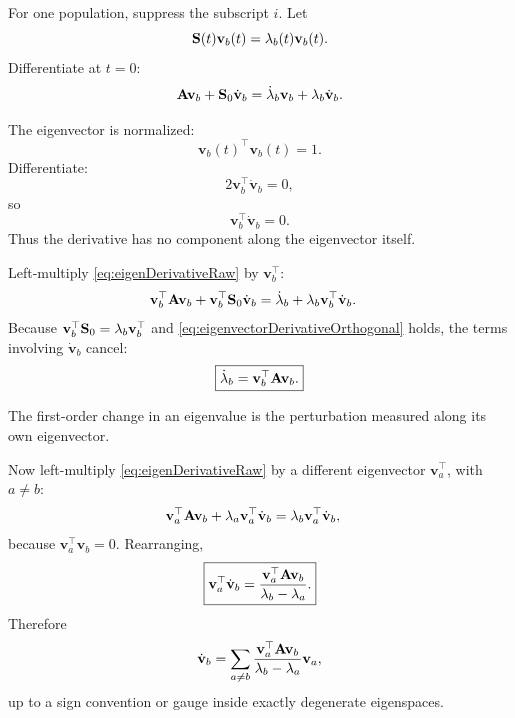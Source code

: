 For one population, suppress the subscript \(i\). Let
\begin{equation}
\mathbf{S}(t)\mathbf v_b(t)=\lambda_b(t)\mathbf v_b(t).
\label{eq:eigenEquationTime}
\end{equation}
Differentiate at \(t=0\):
\begin{equation}
\mathbf{A}\mathbf v_b+\mathbf{S}_0\dot{\mathbf v}_b
=\dot\lambda_b\mathbf v_b+\lambda_b\dot{\mathbf v}_b.
\label{eq:eigenDerivativeRaw}
\end{equation}

The eigenvector is normalized:
\begin{equation}
\mathbf v_b(t)^\top\mathbf v_b(t)=1.
\end{equation}
Differentiate:
\begin{equation}
2\mathbf v_b^\top\dot{\mathbf v}_b=0,
\end{equation}
so
\begin{equation}
\mathbf v_b^\top\dot{\mathbf v}_b=0.
\label{eq:eigenvectorDerivativeOrthogonal}
\end{equation}
Thus the derivative has no component along the eigenvector itself.

Left-multiply \cref{eq:eigenDerivativeRaw} by \(\mathbf v_b^\top\):
\begin{align}
\mathbf v_b^\top\mathbf{A}\mathbf v_b
+\mathbf v_b^\top\mathbf{S}_0\dot{\mathbf v}_b
&=\dot\lambda_b
+\lambda_b\mathbf v_b^\top\dot{\mathbf v}_b.
\end{align}
Because \(\mathbf v_b^\top\mathbf{S}_0=\lambda_b\mathbf v_b^\top\) and \cref{eq:eigenvectorDerivativeOrthogonal} holds, the terms involving \(\dot{\mathbf v}_b\) cancel:
\begin{equation}
\boxed{\dot\lambda_b=\mathbf v_b^\top\mathbf{A}\mathbf v_b.}
\label{eq:eigenvalueDerivative}
\end{equation}

\inwords The first-order change in an eigenvalue is the perturbation measured along its own eigenvector.

Now left-multiply \cref{eq:eigenDerivativeRaw} by a different eigenvector \(\mathbf v_a^\top\), with \(a\neq b\):
\begin{align}
\mathbf v_a^\top\mathbf{A}\mathbf v_b
+\lambda_a\mathbf v_a^\top\dot{\mathbf v}_b
&=\lambda_b\mathbf v_a^\top\dot{\mathbf v}_b,
\end{align}
because \(\mathbf v_a^\top\mathbf v_b=0\). Rearranging,
\begin{equation}
\boxed{
\mathbf v_a^\top\dot{\mathbf v}_b
=\frac{\mathbf v_a^\top\mathbf{A}\mathbf v_b}{\lambda_b-\lambda_a}.}
\label{eq:eigenvectorDerivativeCoefficient}
\end{equation}
Therefore
\begin{equation}
\dot{\mathbf v}_b
=\sum_{a\neq b}
\frac{\mathbf v_a^\top\mathbf{A}\mathbf v_b}{\lambda_b-\lambda_a}\mathbf v_a,
\label{eq:fullEigenvectorDerivative}
\end{equation}
up to a sign convention or gauge inside exactly degenerate eigenspaces.

